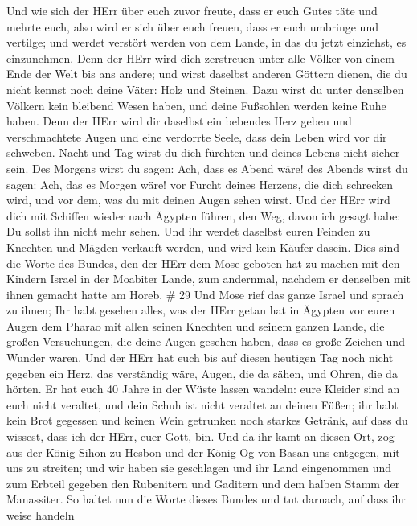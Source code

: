  Und wie sich der HErr über euch zuvor freute, dass er euch
Gutes täte und mehrte euch, also wird er sich über euch freuen, dass er
euch umbringe und vertilge; und werdet verstört werden von dem Lande, in
das du jetzt einziehst, es einzunehmen.  Denn der HErr wird
dich zerstreuen unter alle Völker von einem Ende der Welt bis ans
andere; und wirst daselbst anderen Göttern dienen, die du nicht kennst
noch deine Väter: Holz und Steinen.  Dazu wirst du unter
denselben Völkern kein bleibend Wesen haben, und deine Fußsohlen werden
keine Ruhe haben. Denn der HErr wird dir daselbst ein bebendes Herz
geben und verschmachtete Augen und eine verdorrte Seele, 
dass dein Leben wird vor dir schweben. Nacht und Tag wirst du dich
fürchten und deines Lebens nicht sicher sein.  Des Morgens
wirst du sagen: Ach, dass es Abend wäre! des Abends wirst du sagen: Ach,
das es Morgen wäre! vor Furcht deines Herzens, die dich schrecken wird,
und vor dem, was du mit deinen Augen sehen wirst.  Und der
HErr wird dich mit Schiffen wieder nach Ägypten führen, den Weg, davon
ich gesagt habe: Du sollst ihn nicht mehr sehen. Und ihr werdet daselbst
euren Feinden zu Knechten und Mägden verkauft werden, und wird kein
Käufer dasein.  Dies sind die Worte des Bundes, den der
HErr dem Mose geboten hat zu machen mit den Kindern Israel in der
Moabiter Lande, zum andernmal, nachdem er denselben mit ihnen gemacht
hatte am Horeb. \# 29  Und Mose rief das ganze Israel und
sprach zu ihnen; Ihr habt gesehen alles, was der HErr getan hat in
Ägypten vor euren Augen dem Pharao mit allen seinen Knechten und seinem
ganzen Lande,  die großen Versuchungen, die deine Augen
gesehen haben, dass es große Zeichen und Wunder waren.  Und
der HErr hat euch bis auf diesen heutigen Tag noch nicht gegeben ein
Herz, das verständig wäre, Augen, die da sähen, und Ohren, die da
hörten.  Er hat euch 40 Jahre in der Wüste lassen wandeln:
eure Kleider sind an euch nicht veraltet, und dein Schuh ist nicht
veraltet an deinen Füßen;  ihr habt kein Brot gegessen und
keinen Wein getrunken noch starkes Getränk, auf dass du wissest, dass
ich der HErr, euer Gott, bin.  Und da ihr kamt an diesen
Ort, zog aus der König Sihon zu Hesbon und der König Og von Basan uns
entgegen, mit uns zu streiten; und wir haben sie geschlagen 
und ihr Land eingenommen und zum Erbteil gegeben den Rubenitern und
Gaditern und dem halben Stamm der Manassiter.  So haltet nun
die Worte dieses Bundes und tut darnach, auf dass ihr weise handeln

